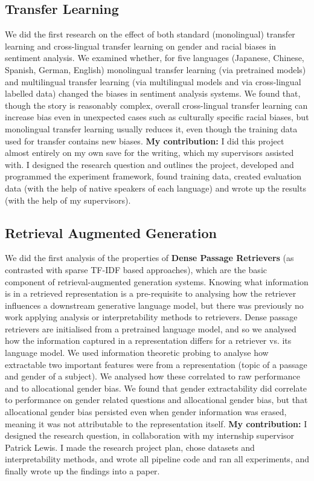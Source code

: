 \subsection{Transfer Learning}
We did the first research on the effect of both standard (monolingual) transfer learning and cross-lingual transfer learning on gender and racial biases in sentiment analysis. We examined whether, for five languages (Japanese, Chinese, Spanish, German, English) monolingual transfer learning (via pretrained models) and multilingual transfer learning (via multilingual models and via cross-lingual labelled data) changed the biases in sentiment analysis systems. We found that, though the story is reasonably complex, overall cross-lingual transfer learning can increase bias even in unexpected cases such as culturally specific racial biases, but monolingual transfer learning usually reduces it, even though the training data used for transfer contains new biases. \textbf{My contribution:} I did this project almost entirely on my own save for the writing, which my supervisors assisted with. I designed the research question and outlines the project, developed and programmed the experiment framework, found training data, created evaluation data (with the help of native speakers of each language) and wrote up the results (with the help of my supervisors). 

\subsection{Retrieval Augmented Generation}
We did the first analysis of the properties of \textbf{Dense Passage Retrievers} (as contrasted with sparse TF-IDF based approaches), which are the basic component of retrieval-augmented generation systems. Knowing what information is in a retrieved representation is a pre-requisite to analysing how the retriever influences a downstream generative language model, but there was previously no work applying analysis or interpretability methods to retrievers. Dense passage retrievers are initialised from a pretrained language model, and so we analysed how the information captured in a representation differs for a retriever vs. its language model. We used information theoretic probing to analyse how extractable two important features were from a representation (topic of a passage and gender of a subject). We analysed how these correlated to raw performance and to allocational gender bias. We found that gender extractability did correlate to performance on gender related questions and allocational gender bias, but that allocational gender bias persisted even when gender information was erased, meaning it was not attributable to the representation itself. \textbf{My contribution:} I designed the research question, in collaboration with my internship supervisor Patrick Lewis. I made the research project plan, chose datasets and interpretability methods, and wrote all pipeline code and ran all experiments, and finally wrote up the findings into a paper.

